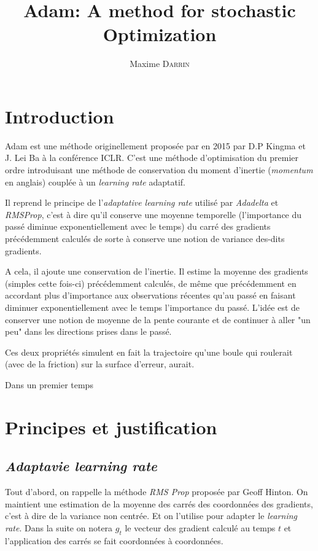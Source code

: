 \documentclass[fleqn,11pt, french, ceqn]{article}
\title{Adam: A method for stochastic Optimization}
\author{Maxime \textsc{Darrin}}
\begin{document}
	\maketitle
	\tableofcontents

	\newpage
	
	\section{Introduction}
	
	Adam est une méthode originellement proposée par en 2015 par D.P Kingma et J. Lei Ba à la conférence ICLR. C'est une méthode d'optimisation du premier ordre introduisant une méthode de conservation du moment d'inertie (\emph{momentum} en anglais) couplée à un \emph{learning rate} adaptatif.
	
	Il reprend le principe de l'\emph{adaptative learning rate} utilisé par \emph{Adadelta\cite{adadelta}} et \emph{RMSProp\cite{rmsprop}}, c'est à dire qu'il conserve une moyenne temporelle (l'importance du passé diminue exponentiellement avec le temps) du carré des gradients précédemment calculés de sorte à conserve une notion de variance des-dits gradients.
		
	A cela, il ajoute une conservation de l'inertie. Il estime la moyenne des gradients (simples cette fois-ci) précédemment calculés, de même que précédemment en accordant plus d'importance aux observations récentes qu'au passé en faisant diminuer exponentiellement avec le temps l'importance du passé. L'idée est de conserver une notion de moyenne de la pente courante et de continuer à aller "un peu" dans les directions prises dans le passé.
	
	Ces deux propriétés simulent en fait la trajectoire qu'une boule qui roulerait (avec de la friction) sur la surface d'erreur, aurait.
	
	Dans un premier temps 
	
	
	\section{Principes et justification}
	
	\subsection{\emph{Adaptavie learning rate}}
	
	Tout d'abord, on rappelle la méthode \emph{RMS Prop} proposée par Geoff Hinton\cite{rmsprop}. On maintient une estimation de la moyenne des carrés des coordonnées des gradients, c'est à dire de la variance non centrée. Et on l'utilise pour adapter le \emph{learning rate}. Dans la suite on notera $g_t$ le vecteur des gradient calculé au temps $t$ et l'application des carrés se fait coordonnées à coordonnées.
	
\end{document}

